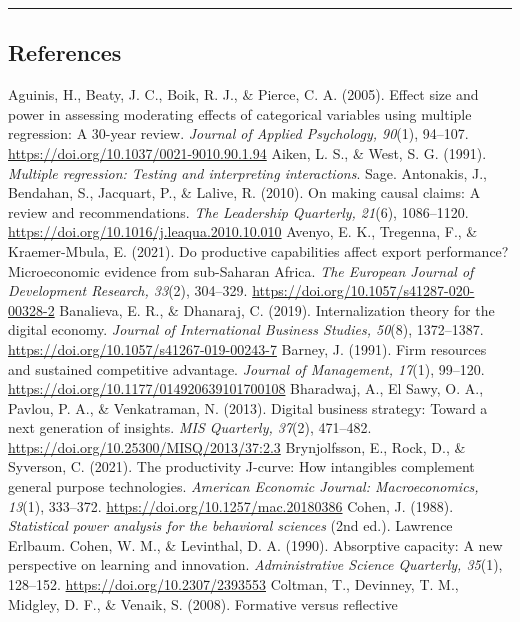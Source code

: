 \documentclass[12pt,a4paper]{article}
\begin{document}
\begin{center}\rule{0.5\linewidth}{0.5pt}\end{center}

\hypertarget{references}{%
\subsection{References}\label{references}}

Aguinis, H., Beaty, J. C., Boik, R. J., \& Pierce, C. A. (2005). Effect
size and power in assessing moderating effects of categorical variables
using multiple regression: A 30-year review. \emph{Journal of Applied
Psychology, 90}(1), 94--107.
\url{https://doi.org/10.1037/0021-9010.90.1.94} Aiken, L. S., \& West,
S. G. (1991). \emph{Multiple regression: Testing and interpreting
interactions}. Sage. Antonakis, J., Bendahan, S., Jacquart, P., \&
Lalive, R. (2010). On making causal claims: A review and
recommendations. \emph{The Leadership Quarterly, 21}(6), 1086--1120.
\url{https://doi.org/10.1016/j.leaqua.2010.10.010} Avenyo, E. K.,
Tregenna, F., \& Kraemer-Mbula, E. (2021). Do productive capabilities
affect export performance? Microeconomic evidence from sub-Saharan
Africa. \emph{The European Journal of Development Research, 33}(2),
304--329. \url{https://doi.org/10.1057/s41287-020-00328-2} Banalieva, E.
R., \& Dhanaraj, C. (2019). Internalization theory for the digital
economy. \emph{Journal of International Business Studies, 50}(8),
1372--1387. \url{https://doi.org/10.1057/s41267-019-00243-7} Barney, J.
(1991). Firm resources and sustained competitive advantage.
\emph{Journal of Management, 17}(1), 99--120.
\url{https://doi.org/10.1177/014920639101700108} Bharadwaj, A., El Sawy,
O. A., Pavlou, P. A., \& Venkatraman, N. (2013). Digital business
strategy: Toward a next generation of insights. \emph{MIS Quarterly,
37}(2), 471--482. \url{https://doi.org/10.25300/MISQ/2013/37:2.3}
Brynjolfsson, E., Rock, D., \& Syverson, C. (2021). The productivity
J-curve: How intangibles complement general purpose technologies.
\emph{American Economic Journal: Macroeconomics, 13}(1), 333--372.
\url{https://doi.org/10.1257/mac.20180386} Cohen, J. (1988).
\emph{Statistical power analysis for the behavioral sciences} (2nd ed.).
Lawrence Erlbaum. Cohen, W. M., \& Levinthal, D. A. (1990). Absorptive
capacity: A new perspective on learning and innovation.
\emph{Administrative Science Quarterly, 35}(1), 128--152.
\url{https://doi.org/10.2307/2393553} Coltman, T., Devinney, T. M.,
Midgley, D. F., \& Venaik, S. (2008). Formative versus reflective
\end{document}
